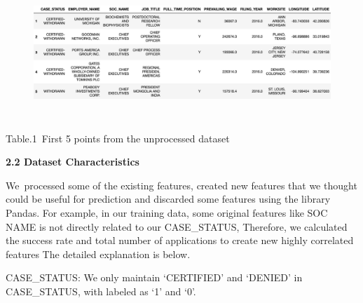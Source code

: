 \documentclass[12pt]{article}
\begin{document}

\begin{figure}[H]
	\begin{Center}
		\includegraphics[width=6.28in,height=1.97in]{./media/image3.jpg}
	\end{Center}
\end{figure}



\begin{justify}
 
\end{justify}\par

\begin{Center}
{\fontsize{8pt}{9.6pt}\selectfont Table.1\  First 5 points from the unprocessed dataset\par}
\end{Center}\par


\vspace{\baselineskip}
\begin{justify}
\textbf{2.2 Dataset Characteristics}
\end{justify}\par

\begin{justify}
We\ processed some of the existing features, created new features that we thought could be useful for prediction and discarded some features using the library Pandas. For example, in our training data, some original features like SOC NAME  is not directly related to our CASE\_STATUS, Therefore, we calculated the success rate and total number of applications to create new highly correlated features The detailed explanation is below.
\end{justify}\par

\begin{justify}
CASE\_STATUS: We only maintain ‘CERTIFIED’ and ‘DENIED’ in CASE\_STATUS, with labeled as ‘1’ and ‘0’.
\end{justify}\par
\end{document}
